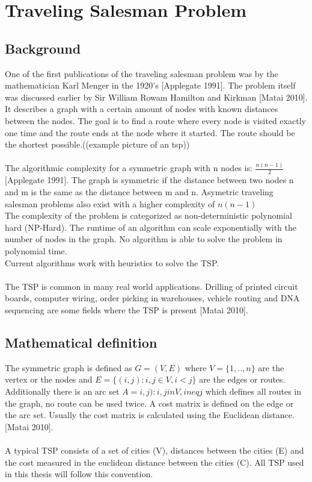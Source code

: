 \chapter{Traveling Salesman Problem}
\label{chap:tsp}
\section{Background}
One of the first publications of the traveling salesman problem was by the mathematician Karl Menger in the 1920's [Applegate 1991]. The problem itself was discussed earlier by Sir William Rowam Hamilton and Kirkman [Matai 2010]. It describes a graph with a certain amount of nodes with known distances between the nodes. The goal is to find a route where every node is visited exactly one time and the route ends at the node where it started. The route should be the shortest possible.((example picture of an tsp))\\\\
The algorithmic complexity for a symmetric graph with n nodes is: $\frac{n(n-1)}{2}$ [Applegate 1991].
The graph is symmetric if the distance between two nodes n and m is the same as the distance between m and n. Asymetric traveling salesman problems also exist with a higher complexity of $n(n-1)$\\
The complexity of the problem is categorized as non-deterministic polynomial hard (NP-Hard). The runtime of an algorithm can scale exponentially with the number of nodes in the graph. No algorithm is able to solve the problem in polynomial time.\\
Current algorithms work with heuristics to solve the TSP.\\\\
The TSP is common in many real world applications. Drilling of printed circuit boards, computer wiring, order picking in warehouses, vehicle routing and DNA sequencing are some fields where the TSP is present [Matai 2010].
\section{Mathematical definition}
The symmetric graph is defined as $G=(V,E)$ where $V=\{1,..,n\}$ are the vertex or the nodes and $E=\{(i,j):i,j\in V, i<j\}$ are the edges or routes. Additionally there is an arc set $A={i,j):i,jin V, ineqj}$ which defines all routes in the graph, no route can be used twice. A cost matrix is defined on the edge or the arc set. Usually the cost matrix is calculated using the Euclidean distance. [Matai 2010].\\\\
A typical TSP consists of a set of cities (V), distances between the cities (E) and the cost measured in the euclidean distance between the cities (C). All TSP used in this thesis will follow this convention. 


 


